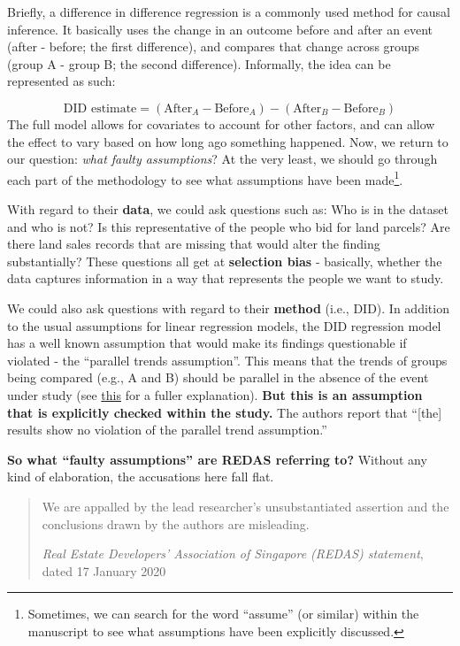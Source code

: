 \documentclass[openany]{book}
\let\rmarkdownfootnote\footnote%
\def\footnote{\protect\rmarkdownfootnote}
\begin{document}
Briefly, a difference in difference regression is a commonly used method
for causal inference. It basically uses the change in an outcome before
and after an event (after - before; the first difference), and compares
that change across groups (group A - group B; the second difference).
Informally, the idea can be represented as such:

\[
\text{DID estimate} = (\text{After}_A-\text{Before}_A) - (\text{After}_B-\text{Before}_B) 
\] The full model allows for covariates to account for other factors,
and can allow the effect to vary based on how long ago something
happened. Now, we return to our question: \emph{what faulty
assumptions}? At the very least, we should go through each part of the
methodology to see what assumptions have been made\footnote{Sometimes,
  we can search for the word ``assume'' (or similar) within the
  manuscript to see what assumptions have been explicitly discussed.}.

With regard to their \textbf{data}, we could ask questions such as: Who
is in the dataset and who is not? Is this representative of the people
who bid for land parcels? Are there land sales records that are missing
that would alter the finding substantially? These questions all get at
\textbf{selection bias} - basically, whether the data captures
information in a way that represents the people we want to study.

We could also ask questions with regard to their \textbf{method} (i.e.,
DID). In addition to the usual assumptions for linear regression models,
the DID regression model has a well known assumption that would make its
findings questionable if violated - the ``parallel trends assumption''.
This means that the trends of groups being compared (e.g., A and B)
should be parallel in the absence of the event under study (see
\href{https://www.mailman.columbia.edu/research/population-health-methods/difference-difference-estimation}{this}
for a fuller explanation). \textbf{But this is an assumption that is
explicitly checked within the study.} The authors report that
``{[}the{]} results show no violation of the parallel trend
assumption.''

\textbf{So what ``faulty assumptions'' are REDAS referring to?} Without
any kind of elaboration, the accusations here fall flat.

\begin{quote}
We are appalled by the lead researcher's unsubstantiated assertion and
the conclusions drawn by the authors are misleading.

\emph{Real Estate Developers' Association of Singapore (REDAS)
statement}, dated 17 January 2020
\end{quote}
\end{document}
